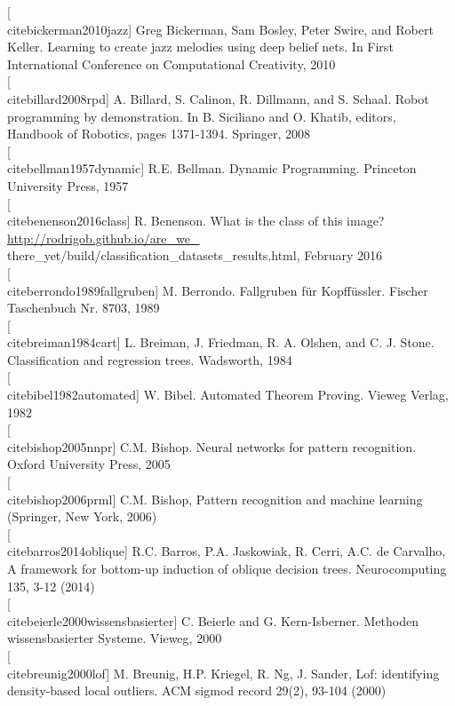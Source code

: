 \documentclass[10pt]{book}
\begin{document}
[\\cite{bickerman2010jazz}] Greg Bickerman, Sam Bosley, Peter Swire, and Robert Keller. Learning to create jazz melodies using deep belief nets. In First International Conference on Computational Creativity, 2010\\[0pt]
[\\cite{billard2008rpd}] A. Billard, S. Calinon, R. Dillmann, and S. Schaal. Robot programming by demonstration. In B. Siciliano and O. Khatib, editors, Handbook of Robotics, pages 1371-1394. Springer, 2008\\[0pt]
[\\cite{bellman1957dynamic}] R.E. Bellman. Dynamic Programming. Princeton University Press, 1957\\[0pt]
[\\cite{benenson2016class}] R. Benenson. What is the class of this image? \href{http://rodrigob.github.io/are_we_}{http://rodrigob.github.io/are\_we\_} there\_yet/build/classification\_datasets\_results.html, February 2016\\[0pt]
[\\cite{berrondo1989fallgruben}] M. Berrondo. Fallgruben für Kopffüssler. Fischer Taschenbuch Nr. 8703, 1989\\[0pt]
[\\cite{breiman1984cart}] L. Breiman, J. Friedman, R. A. Olshen, and C. J. Stone. Classification and regression trees. Wadsworth, 1984\\[0pt]
[\\cite{bibel1982automated}] W. Bibel. Automated Theorem Proving. Vieweg Verlag, 1982\\[0pt]
[\\cite{bishop2005nnpr}] C.M. Bishop. Neural networks for pattern recognition. Oxford University Press, 2005\\[0pt]
[\\cite{bishop2006prml}] C.M. Bishop, Pattern recognition and machine learning (Springer, New York, 2006)\\[0pt]
[\\cite{barros2014oblique}] R.C. Barros, P.A. Jaskowiak, R. Cerri, A.C. de Carvalho, A framework for bottom-up induction of oblique decision trees. Neurocomputing 135, 3-12 (2014)\\[0pt]
[\\cite{beierle2000wissensbasierter}] C. Beierle and G. Kern-Isberner. Methoden wissensbasierter Systeme. Vieweg, 2000\\[0pt]
[\\cite{breunig2000lof}] M. Breunig, H.P. Kriegel, R. Ng, J. Sander, Lof: identifying density-based local outliers. ACM sigmod record 29(2), 93-104 (2000)\\[0pt]
\end{document}
